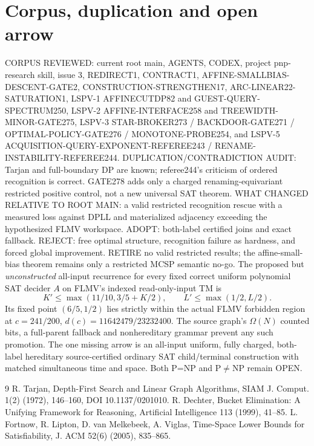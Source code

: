 \documentclass[11pt]{article}
\begin{document}
\section*{Corpus, duplication and open arrow}
CORPUS REVIEWED: current root main, AGENTS, CODEX, project pnp-research skill, issue 3, REDIRECT1, CONTRACT1, AFFINE-SMALLBIAS-DESCENT-GATE2, CONSTRUCTION-STRENGTHEN17, ARC-LINEAR22-SATURATION1, LSPV-1 AFFINECUTDP82 and GUEST-QUERY-SPECTRUM250, LSPV-2 AFFINE-INTERFACE258 and TREEWIDTH-MINOR-GATE275, LSPV-3 STAR-BROKER273 / BACKDOOR-GATE271 / OPTIMAL-POLICY-GATE276 / MONOTONE-PROBE254, and LSPV-5 ACQUISITION-QUERY-EXPONENT-REFEREE243 / RENAME-INSTABILITY-REFEREE244.
DUPLICATION/CONTRADICTION AUDIT: Tarjan and full-boundary DP are known; referee244's criticism of ordered recognition is correct. GATE278 adds only a charged renaming-equivariant restricted positive control, not a new universal SAT theorem. WHAT CHANGED RELATIVE TO ROOT MAIN: a valid restricted recognition rescue with a measured loss against DPLL and materialized adjacency exceeding the hypothesized FLMV workspace. ADOPT: both-label certified joins and exact fallback. REJECT: free optimal structure, recognition failure as hardness, and forced global improvement. RETIRE no valid restricted results; the affine-small-bias theorem remains only a restricted MCSP semantic no-go.
The proposed but \emph{unconstructed} all-input recurrence for every fixed correct uniform polynomial SAT decider $A$ on FLMV's indexed read-only-input TM is
\[
K'\le\max(11/10,3/5+K/2),\qquad L'\le\max(1/2,L/2).
\]
Its fixed point $(6/5,1/2)$ lies strictly within the actual FLMV forbidden region at $c=241/200$, $d(c)=11642479/23232400$. The source graph's $\Omega(N)$ counted bits, a full-parent fallback and nonhereditary grammar prevent any such promotion. The one missing arrow is an all-input uniform, fully charged, both-label hereditary source-certified ordinary SAT child/terminal construction with matched simultaneous time and space. Both P=NP and P$\ne$NP remain OPEN.
\begin{thebibliography}{9}
 R. Tarjan, Depth-First Search and Linear Graph Algorithms, SIAM J. Comput. 1(2) (1972), 146--160, DOI 10.1137/0201010.
 R. Dechter, Bucket Elimination: A Unifying Framework for Reasoning, Artificial Intelligence 113 (1999), 41--85.
 L. Fortnow, R. Lipton, D. van Melkebeek, A. Viglas, Time-Space Lower Bounds for Satisfiability, J. ACM 52(6) (2005), 835--865.
\end{thebibliography}
\end{document}
